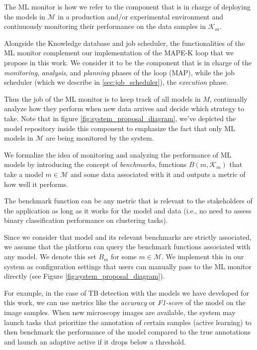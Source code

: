 \documentclass[../main.tex]{subfiles}
\begin{document}
    The ML monitor is how we refer to the component that is in charge of deploying the models in $\mathcal{M}$ in a production and/or experimental environment and continuously monitoring their performance on the data samples in $\mathcal{K}_m$.

    Alongside the Knowledge database and job scheduler, the functionalities of the ML monitor complement our implementation of the MAPE-K loop that we propose in this work. We consider it to be the component that is in charge of the \textit{monitoring}, \textit{analysis}, and \textit{planning} phases of the loop (MAP), while the job scheduler (which we describe in \ref{sec:job_scheduler}), the \textit{execution} phase.

    Thus the job of the ML monitor is to keep track of all models in $M$, continually analyze how they perform when new data arrives and decide which strategy to take. Note that in figure \ref{fig:system_proposal_diagram}, we've depicted the model repository inside this component to emphasize the fact that only ML models in $\mathcal{M}$ are being monitored by the system. 
    
    We formalize the idea of monitoring and analyzing the performance of ML models by introducing the concept of \textit{benchmarks}, functions $B(m, \mathcal{K}_m)$ that take a model $m \in \mathcal{M}$ and some data associated with it and outputs a metric of how well it performs.
    
    The benchmark function can be any metric that is relevant to the stakeholders of the application as long as it works for the model and data (i.e., no need to assess binary classification performance on clustering tasks). 
    
    Since we consider that model and its relevant benchmarks are strictly associated, we assume that the platform can query the benchmark functions associated with any model. We denote this set $B_m$ for some $m \in \mathcal{M}$. We implement this in our system as configuration settings that users can manually pass to the ML monitor directly (see Figure \ref{fig:system_proposal_diagram}).
    
    For example, in the case of TB detection with the models we have developed for this work, we can use metrics like the \textit{accuracy} or \textit{F1-score} of the model on the image samples. When new microscopy images are available, the system may launch tasks that prioritize the annotation of certain samples (active learning) to then benchmark the performance of the model compared to the true annotations and launch an adaptive active if it drops below a threshold.
\end{document}
